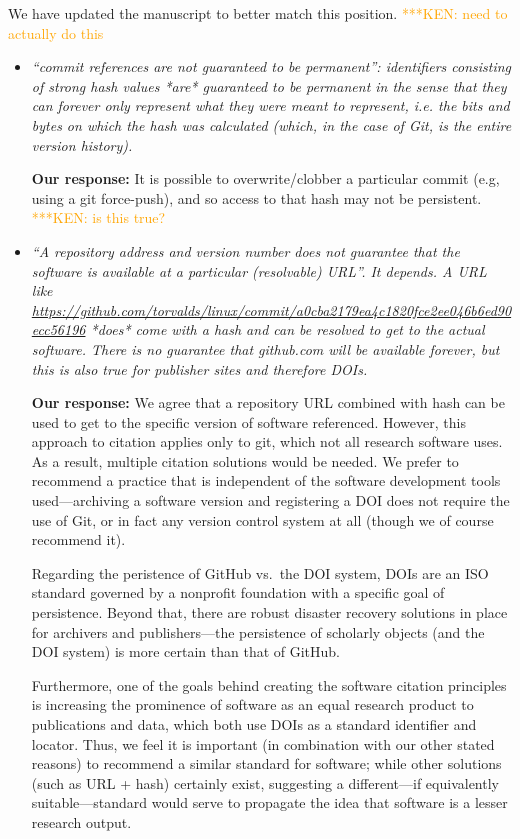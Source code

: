 \documentclass{article}
\newcommand{\niemnote}[1]{ {\textcolor{orange} { ***KEN: #1 }}} %
\begin{document}
\begin{enumerate}
We have updated the manuscript to better match this position.
\niemnote{need to actually do this}

\begin{itemize}

\item \emph{``commit references are not guaranteed to be permanent'':
identifiers consisting of strong hash values *are* guaranteed to be permanent
in the sense that they can forever only represent what they were meant to
represent, i.e. the bits and bytes on which the hash was calculated (which, in
the case of Git, is the entire version history).}

\textbf{Our response:}
It is possible to overwrite\slash clobber a particular commit (e.g, using a
git force-push), and so access to that hash may not be persistent.\niemnote{is this true?}

\item \emph{``A repository address and version number does not guarantee that
the software is available at a particular (resolvable) URL''. It depends. A URL
like \url{https://github.com/torvalds/linux/commit/a0cba2179ea4c1820fce2ee046b6ed90ecc56196}
*does* come with a hash and can be resolved to get to the actual software.
There is no guarantee that github.com will be available forever, but this is
also true for publisher sites and therefore DOIs.}

\textbf{Our response:}
We agree that a repository URL combined with hash can be used to get to
the specific version of software referenced. However, this approach to citation
applies only to git, which not all research software uses. As a result, multiple
citation solutions would be needed. We prefer to recommend a practice that is
independent of the software development tools used---archiving a software
version and registering a DOI does not require the use of Git, or in fact any
version control system at all (though we of course recommend it).

Regarding the peristence of GitHub vs.\ the DOI system, DOIs are an ISO standard
governed by a nonprofit foundation with a specific goal of persistence. Beyond
that, there are robust disaster recovery solutions in place for archivers and
publishers---the persistence of scholarly objects (and the DOI system) is
more certain than that of GitHub.

Furthermore, one of the goals behind creating the software citation principles
is increasing the prominence of software as an equal research product to
publications and data, which both use DOIs as a standard identifier and locator.
Thus, we feel it is important (in combination with our other stated reasons) to
recommend a similar standard for software; while other solutions (such as URL +
hash) certainly exist, suggesting a different---if equivalently suitable---standard
would serve to propagate the idea that software is a lesser research output.


\end{itemize}
\end{enumerate}
\end{document}
